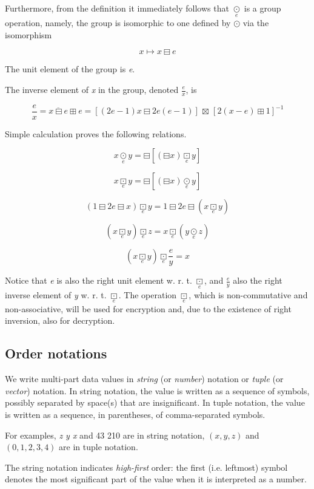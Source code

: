 \documentclass[a4paper,oneside,english]{amsart}
\numberwithin{equation}{section}
\numberwithin{figure}{section}
\begin{document}
Furthermore, from the definition it immediately follows that $\underset{e}{\odot}$
is a group operation, namely, the group is isomorphic to one defined
by $\odot$ via the isomorphism

\[
x\mapsto x\boxminus e
\]


The unit element of the group is \emph{e}. 

The inverse element of \emph{x} in the group, denoted $\frac{e}{x}$,
is

\[
\frac{e}{x}=\overline{x\boxminus e}\boxplus e=\left[(2e-1)x\boxminus2e(e-1)\right]\,\boxtimes\,\left[2(x-e)\boxplus1\right]^{-1}
\]


Simple calculation proves the following relations.

\[
x\underset{e}{\odot}y=\boxminus\left[(\boxminus x)\underset{e}{\boxdot}y\right]
\]


\[
x\underset{e}{\boxdot}y=\boxminus\left[(\boxminus x)\underset{e}{\odot}y\right]
\]


\[
(1\boxminus2e\boxminus x)\underset{e}{\boxdot}y=1\boxminus2e\boxminus(x\underset{e}{\boxdot}y)
\]


\[
(x\underset{e}{\boxdot}y)\underset{e}{\boxdot}z=x\underset{e}{\boxdot}(y\underset{e}{\odot}z)
\]


\[
(x\underset{e}{\boxdot}y)\underset{e}{\boxdot}\frac{e}{y}=x
\]


Notice that \emph{e} is also the right unit element w. r. t. $\underset{e}{\boxdot}$,
and $\frac{e}{y}$ also the right inverse element of \emph{y} w. r.
t. $\underset{e}{\boxdot}$. The operation $\underset{e}{\boxdot}$,
which is non-commutative and non-associative, will be used for encryption
and, due to the existence of right inversion, also for decryption.


\subsection{Order notations}

We write multi-part data values in \emph{string} (or \emph{number})
notation or \emph{tuple} (or \emph{vector}) notation. In string notation,
the value is written as a sequence of symbols, possibly separated
by space(s) that are insignificant. In tuple notation, the value is
written as a sequence, in parentheses, of comma-separated symbols.

For examples, \emph{z y x} and 43 210 are in string notation, $(x,y,z)$
and $(0,1,2,3,4)$ are in tuple notation.

The string notation indicates \emph{high-first} order: the first (i.e.
leftmost) symbol denotes the most significant part of the value when
it is interpreted as a number.
\end{document}
